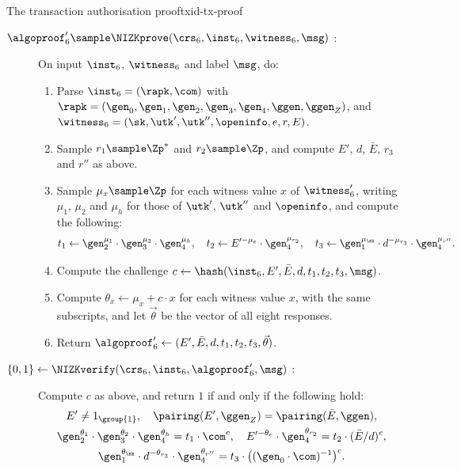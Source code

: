 \begin{protocolbox}{The transaction authorisation proof}{txid-tx-proof}

  \begin{description}

    \item[$\algoproof_6' \sample \NIZKprove(\crs_6, \inst_6, \witness_6,
\msg)$ :] On input $\inst_6$, $\witness_6$ and label $\msg$, do:

      \begin{enumerate}

	\item Parse $\inst_6 = (\rapk, \com)$ with $\rapk = (\gen_0, \gen_1, \gen_2,
\gen_3, \gen_4, \ggen, \ggen_Z)$, and $\witness_6 = (\sk, \utk', \utk'',
\openinfo, e, r, E)$.

	\item Sample $r_1 \sample \Zp^*$ and $r_2 \sample \Zp$, and compute
$E'$, $d$, $\bar{E}$, $r_3$ and $r''$ as above.

	\item Sample $\mu_x \sample \Zp$ for each witness value $x$ of
$\witness_6'$, writing $\mu_1$, $\mu_2$ and $\mu_h$ for those of $\utk'$,
$\utk''$ and $\openinfo$, and compute the following:
	  \begin{equation*}
	    t_1 \leftarrow \gen_2^{\mu_1}\cdot\gen_3^{\mu_2}\cdot
\gen_4^{\mu_h}, \quad t_2 \leftarrow E'^{-\mu_e}\cdot\gen_4^{\mu_{r_2}}, \quad
t_3 \leftarrow \gen_1^{\mu_\sk}\cdot d^{-\mu_{r_3}}\cdot \gen_4^{\mu_{r''}}.
	  \end{equation*}

	\item Compute the challenge $c \leftarrow \hash(\inst_6, E', \bar{E}, d,
t_1, t_2, t_3, \msg)$.

	\item Compute $\theta_x \leftarrow \mu_x + c\cdot x$ for each witness
value $x$, with the same subscripts, and let $\vec{\theta}$ be the vector of
all eight responses.

	\item Return $\algoproof_6' \leftarrow (E', \bar{E}, d, t_1, t_2, t_3,
\vec{\theta})$.

      \end{enumerate}

    \item[$\{0,1\} \leftarrow \NIZKverify(\crs_6, \inst_6, \algoproof_6',
\msg)$ :] Compute $c$ as above, and return $1$ if and only if the following
hold:
      \begin{gather*}
	E' \neq 1_{\group{1}}, \quad \pairing(E', \ggen_Z) = \pairing(\bar{E},
\ggen), \\
	\gen_2^{\theta_1}\cdot\gen_3^{\theta_2}\cdot\gen_4^{\theta_h} =
t_1\cdot\com^c, \quad E'^{-\theta_e}\cdot\gen_4^{\theta_{r_2}} =
t_2\cdot(\bar{E}/d)^c, \\ \gen_1^{\theta_\sk}\cdot d^{-\theta_{r_3}}\cdot
\gen_4^{\theta_{r''}} = t_3\cdot\big((\gen_0\cdot\com)^{-1}\big)^{c}.
      \end{gather*}

  \end{description}

\end{protocolbox}

